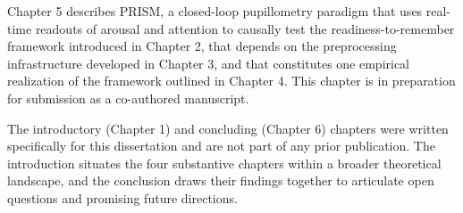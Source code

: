 Chapter 5 describes PRISM, a closed-loop pupillometry paradigm that uses real-time readouts of arousal and attention to causally test the readiness-to-remember framework introduced in Chapter 2, that depends on the preprocessing infrastructure developed in Chapter 3, and that constitutes one empirical realization of the framework outlined in Chapter 4. This chapter is in preparation for submission as a co-authored manuscript.

The introductory (Chapter 1) and concluding (Chapter 6) chapters were written specifically for this dissertation and are not part of any prior publication. The introduction situates the four substantive chapters within a broader theoretical landscape, and the conclusion draws their findings together to articulate open questions and promising future directions.
